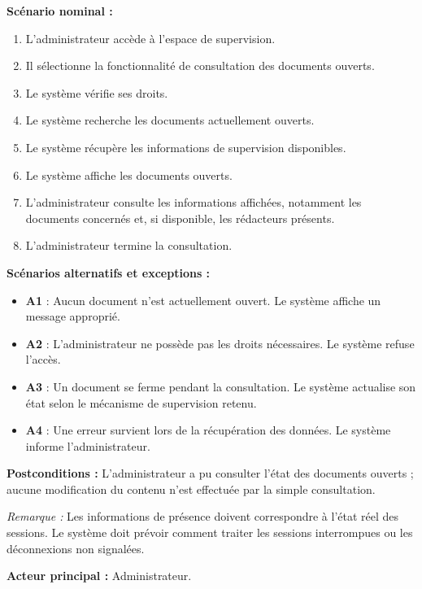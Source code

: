 \begin{description}[leftmargin=0pt, style=nextline, font=\normalfont\bfseries\color{violetprincipal}]
    \textbf{Scénario nominal :}
    \begin{enumerate}
        \item L'administrateur accède à l'espace de supervision.
        \item Il sélectionne la fonctionnalité de consultation des documents ouverts.
        \item Le système vérifie ses droits.
        \item Le système recherche les documents actuellement ouverts.
        \item Le système récupère les informations de supervision disponibles.
        \item Le système affiche les documents ouverts.
        \item L'administrateur consulte les informations affichées, notamment les documents concernés et, si disponible, les rédacteurs présents.
        \item L'administrateur termine la consultation.
    \end{enumerate}

    \textbf{Scénarios alternatifs et exceptions :}
    \begin{itemize}
        \item \textbf{A1} : Aucun document n'est actuellement ouvert. Le système affiche un message approprié.
        \item \textbf{A2} : L'administrateur ne possède pas les droits nécessaires. Le système refuse l'accès.
        \item \textbf{A3} : Un document se ferme pendant la consultation. Le système actualise son état selon le mécanisme de supervision retenu.
        \item \textbf{A4} : Une erreur survient lors de la récupération des données. Le système informe l'administrateur.
    \end{itemize}

    \textbf{Postconditions :} L'administrateur a pu consulter l'état des documents ouverts ; aucune modification du contenu n'est effectuée par la simple consultation.

    \textit{Remarque :} Les informations de présence doivent correspondre à l'état réel des sessions. Le système doit prévoir comment traiter les sessions interrompues ou les déconnexions non signalées.

    \item[UC11 --- Consulter les liens de téléchargement]

    \textbf{Acteur principal :} Administrateur.


\end{description}
